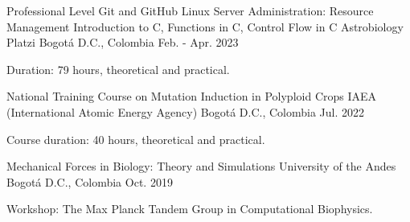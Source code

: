 \begin{cventries}
    
    \cventry
    {Professional Level Git and GitHub
    \newline
    Linux Server Administration: Resource Management
    \newline
    Introduction to C, Functions in C, Control Flow in C
    \newline
    Astrobiology} %
    {Platzi} %
    {Bogotá D.C., Colombia} %
    {Feb. - Apr. 2023} %
    { %
    \begin{cvitems}
    \item {Duration: 79 hours, theoretical and practical.}
    \end{cvitems}
    }
    
    
    \cventry
    {National Training Course on Mutation Induction in Polyploid Crops} %
    {IAEA (International Atomic Energy Agency)} %
    {Bogotá D.C., Colombia} %
    {Jul. 2022} %
    { %
    \begin{cvitems}
    \item {Course duration: 40 hours, theoretical and practical.}
    \end{cvitems}
    }
    
    
    \cventry
    {Mechanical Forces in Biology: Theory and Simulations} %
    {University of the Andes} %
    {Bogotá D.C., Colombia} %
    {Oct. 2019} %
    { %
    \begin{cvitems}
    \item {Workshop: The Max Planck Tandem Group in Computational Biophysics.}
    \end{cvitems}
    }
    
    
    \end{cventries}
    